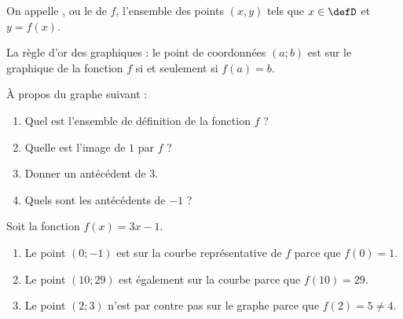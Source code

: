 \begin{definition}
    On appelle , ou le  de $f$, l'ensemble des points $(x,y)$ tels que $x\in\defD$ et $y=f(x)$.
\end{definition}


\begin{Aprojeter}



\begin{Aretenir}
    La règle d'or des graphiques : le point de coordonnées \( (a;b)\) est sur le graphique de la fonction \( f\) si et seulement si \( f(a)=b\).
\end{Aretenir}

%


À propos du graphe suivant :
\begin{center}
   
\end{center}
\begin{enumerate}
    \item
        Quel est l'ensemble de définition de la fonction \( f\) ?
    \item
        Quelle est l'image de \( 1\) par \( f\) ?
    \item
        Donner un antécédent de \( 3\).
    \item
        Quels sont les antécédents de \( -1\) ?
\end{enumerate}
    
\end{Aprojeter}

\begin{example}
    Soit la fonction \( f(x)=3x-1\).
    \begin{enumerate}
        \item
            Le point \( (0;-1)\) est sur la courbe représentative de \( f\) parce que \( f(0)=1\).
        \item
            Le point \( (10;29)\) est également sur la courbe parce que \( f(10)=29\).
        \item
            Le point \( (2;3)\) n'est par contre pas sur le graphe parce que \( f(2)=5\neq 4\).
    \end{enumerate}
\end{example}

